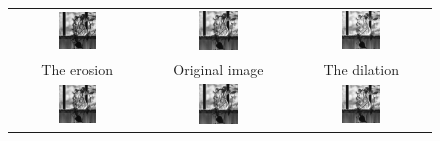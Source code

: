 \documentclass[a4paper]{article}
\begin{document}
\begin{enumerate}
\begin{figure}[H]
\begin{tabular}{ccc}
    \includegraphics[width=0.3\textwidth]{../lab4ex2/gerode.png} & \includegraphics[width=0.3\textwidth]{../lab4ex2/vase.png} & \includegraphics[width=0.3\textwidth]{../lab4ex2/gdilate.png} \\
    The erosion & Original image & The dilation \\
    \includegraphics[width=0.3\textwidth]{../lab4ex2/gopening.png} & \includegraphics[width=0.3\textwidth]{../lab4ex2/vase.png} & \includegraphics[width=0.3\textwidth]{../lab4ex2/gclosing.png} \\

\end{tabular}
\end{figure}
\end{enumerate}
\end{document}
